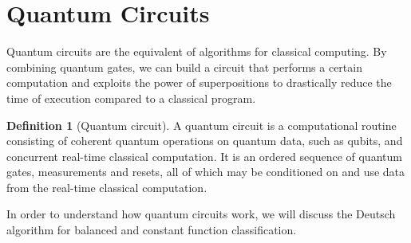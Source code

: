 \documentclass[12pt,a4paper]{report}
\theoremstyle{definition}
\newtheorem{definition}{Definition}[section]
\theoremstyle{definition}
\theoremstyle{definition}
\begin{document}
\section{Quantum Circuits}
Quantum circuits are the equivalent of algorithms for classical computing. By combining quantum gates, we can build a circuit that performs a certain computation and exploits the power of superpositions to drastically reduce the time of execution compared to a classical program.
\begin{definition}[Quantum circuit] %
A quantum circuit is a computational routine consisting of coherent quantum operations on quantum data, such as qubits, and concurrent real-time classical computation. It is an ordered sequence of quantum gates, measurements and resets, all of which may be conditioned on and use data from the real-time classical computation.
\end{definition}
In order to understand how quantum circuits work, we will discuss the Deutsch algorithm for balanced and constant function classification.
\end{document}
